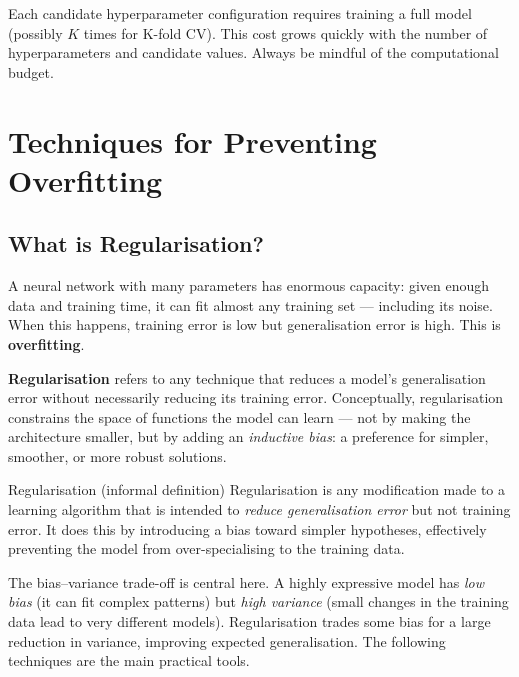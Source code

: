 \documentclass[11pt,a4paper]{article}
\newcommand{\term}[1]{\textcolor{DefGreen}{\textbf{#1}}}
\begin{document}
\begin{warnbox}
Each candidate hyperparameter configuration requires training a full model (possibly $K$ times for K-fold CV). This cost grows quickly with the number of hyperparameters and candidate values. Always be mindful of the computational budget.
\end{warnbox}

\section{Techniques for Preventing Overfitting}

\subsection{What is Regularisation?}

A neural network with many parameters has enormous capacity: given enough data and training time, it can fit almost any training set — including its noise. When this happens, training error is low but generalisation error is high. This is \term{overfitting}.

\term{Regularisation} refers to any technique that reduces a model's generalisation error without necessarily reducing its training error. Conceptually, regularisation constrains the space of functions the model can learn — not by making the architecture smaller, but by adding an \emph{inductive bias}: a preference for simpler, smoother, or more robust solutions.

\begin{defbox}{Regularisation (informal definition)}
Regularisation is any modification made to a learning algorithm that is intended to \emph{reduce generalisation error} but not training error. It does this by introducing a bias toward simpler hypotheses, effectively preventing the model from over-specialising to the training data.
\end{defbox}

The bias–variance trade-off is central here. A highly expressive model has \emph{low bias} (it can fit complex patterns) but \emph{high variance} (small changes in the training data lead to very different models). Regularisation trades some bias for a large reduction in variance, improving expected generalisation. The following techniques are the main practical tools.
\end{document}
